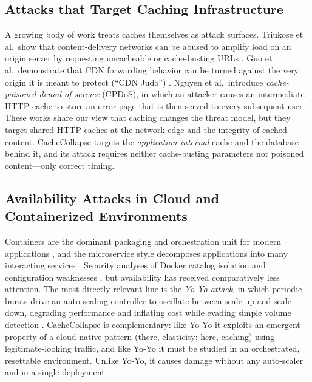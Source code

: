 \documentclass[preprint,12pt]{elsarticle}
\begin{document}
\subsection{Attacks that Target Caching Infrastructure}
A growing body of work treats caches themselves as attack surfaces. Triukose et al.\
show that content-delivery networks can be abused to amplify load on an origin server
by requesting uncacheable or cache-busting URLs \cite{triukose2009}. Guo et al.\
demonstrate that CDN forwarding behavior can be turned against the very origin it is
meant to protect (``CDN Judo'') \cite{guo2020}. Nguyen et al.\ introduce
\emph{cache-poisoned denial of service} (CPDoS), in which an attacker causes an
intermediate HTTP cache to store an error page that is then served to every subsequent
user \cite{nguyen2019}. These works share our view that caching changes the threat
model, but they target shared HTTP caches at the network edge and the integrity of
cached content. CacheCollapse targets the \emph{application-internal} cache and the
database behind it, and its attack requires neither cache-busting parameters nor
poisoned content---only correct timing.

\subsection{Availability Attacks in Cloud and Containerized Environments}
Containers are the dominant packaging and orchestration unit for modern applications
\cite{pahl2015,merkel2014,burns2016}, and the microservice style decomposes
applications into many interacting services \cite{dragoni2017}. Security analyses of
Docker catalog isolation and configuration weaknesses \cite{combe2016,sultan2019}, but
availability has received comparatively less attention. The most directly relevant
line is the \emph{Yo-Yo attack}, in which periodic bursts drive an auto-scaling
controller to oscillate between scale-up and scale-down, degrading performance and
inflating cost while evading simple volume detection \cite{sides2016,bremlerbarr2017}.
CacheCollapse is complementary: like Yo-Yo it exploits an emergent property of a
cloud-native pattern (there, elasticity; here, caching) using legitimate-looking
traffic, and like Yo-Yo it must be studied in an orchestrated, resettable environment.
Unlike Yo-Yo, it causes damage without any auto-scaler and in a single deployment.
\end{document}
